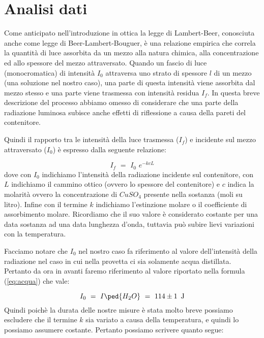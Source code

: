 \section{Analisi dati}

Come anticipato nell'introduzione in ottica la legge di Lambert-Beer, conosciuta anche come legge di Beer-Lambert-Bouguer, è una relazione empirica che correla la quantità di luce assorbita da un mezzo alla natura chimica, alla concentrazione ed allo spessore del mezzo attraversato.
Quando un fascio di luce (monocromatica) di intensità $I_0$ attraversa uno strato di spessore $l$ di un mezzo (una soluzione nel nostro caso), una parte di questa intensità viene assorbita dal mezzo stesso e una parte viene trasmessa con intensità residua $I_f$.
In questa breve descrizione del processo abbiamo omesso di considerare che una parte della radiazione luminosa subisce anche effetti di riflessione a causa della pareti del contenitore.

Quindi il rapporto tra le intensità della luce trasmessa ($I_f$) e incidente sul mezzo attraversato ($I_0$) è espresso dalla seguente relazione:

\begin{equation}
	I_f \,\,=\,\, I_0 \,\, e^{-kcL}
	\label{eq:intensita}
\end{equation}
%
dove con $I_0$ indichiamo l'intensità della radiazione incidente sul contenitore, con $L$ indichiamo il cammino ottico (ovvero lo spessore del contenitore) e $c$ indica la molarità ovvero la concentrazione di $CuSO_4$ presente nella sostanza (moli su litro). Infine con il termine $k$ indichiamo l'estinzione molare o il coefficiente di assorbimento molare. Ricordiamo che il suo valore è considerato costante per una data sostanza ad una data lunghezza d'onda, tuttavia può subire lievi variazioni con la temperatura.

Facciamo notare che $I_0$ nel nostro caso fa riferimento al valore dell'intensità della radiazione nel caso in cui nella provetta ci sia solamente acqua distillata. Pertanto da ora in avanti faremo riferimento al valore riportato nella formula (\ref{eq:acqua}) che vale:

\begin{equation}
	I_0 \,\,=\,\, I\ped{H_2O} \,\,=\,\, 114 \pm 1 \,\,\, \si{\joule}
\end{equation}
%
Quindi poichè la durata delle nostre misure è stata molto breve possiamo escludere che il termine $k$ sia variato a causa della temperatura, e quindi lo possiamo assumere costante.
Pertanto possiamo scrivere quanto segue:

